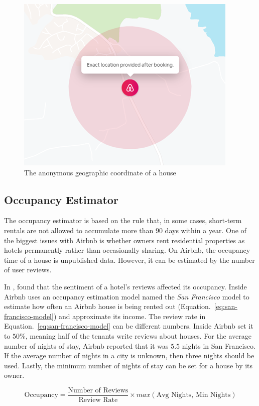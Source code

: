 \documentclass[conference, compsoc]{IEEEtran}
\begin{document}
\begin{figure}[htbp]
    \centerline{\includegraphics[width=0.5\linewidth]{figures/anonymous-house-coordinate.png}}
    \caption{The anonymous geographic coordinate of a house}
    \label{fig:anonymous-house-coordinate}
\end{figure}

\subsection{Occupancy Estimator}
The occupancy estimator is based on the rule that, in some cases, short-term rentals are not allowed to accumulate more than $90$ days within a year.
One of the biggest issues with Airbnb is whether owners rent residential properties as hotels permanently rather than occasionally sharing.
On Airbnb, the occupancy time of a house is unpublished data. However, it can be estimated by the number of user reviews.

In \cite{sentiment-forecast}, \citeauthor{sentiment-forecast} found that the sentiment of a hotel's reviews affected its occupancy.
Inside Airbnb uses an occupancy estimation model named the \emph{San Francisco} model \cite{san-francisco-model} to estimate how often an Airbnb house is being rented out (Equation.~\ref{eq:san-francisco-model}) and approximate its income.
The review rate in Equation.~\ref{eq:san-francisco-model} can be different numbers.
Inside Airbnb set it to $50\%$, meaning half of the tenants write reviews about houses.
For the average number of nights of stay, Airbnb reported that it was $5.5$ nights in San Francisco.
If the average number of nights in a city is unknown, then three nights should be used.
Lastly, the minimum number of nights of stay can be set for a house by its owner.

\begin{strip}
    \begin{equation}
        \text{Occupancy} = \frac{\text{Number of Reviews}}{\text{Review Rate}} \times max(\text{Avg Nights},\, \text{Min Nights})
        \label{eq:san-francisco-model}
    \end{equation}
\end{strip}
\end{document}
